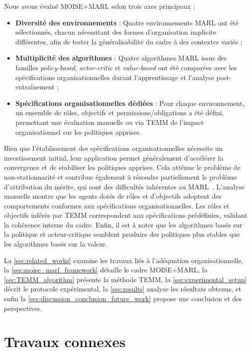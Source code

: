 \documentclass[francais,ROIA,Unicode,manuscript]{cedram}
\begin{document}
\noindent
Nous avons évalué MOISE+MARL selon trois axes principaux :
%
\begin{itemize}
    \item \textbf{Diversité des environnements} : Quatre environnements MARL ont été sélectionnés, chacun nécessitant des formes d’organisation implicite différentes, afin de tester la généralisabilité du cadre à des contextes variés ;
    \item \textbf{Multiplicité des algorithmes} : Quatre algorithmes MARL issus des familles \textit{policy-based}, \textit{actor-critic} et \textit{value-based} ont été comparées avec les spécifications organisationnelles durant l’apprentissage et l’analyse post-entraînement ;
    \item \textbf{Spécifications organisationnelles dédiées} : Pour chaque environnement, un ensemble de rôles, objectifs et permissions/obligations a été défini, permettant une évaluation manuelle ou via TEMM de l’impact organisationnel sur les politiques apprises.
\end{itemize}
%
Bien que l’établissement des spécifications organisationnelles nécessite un investissement initial, leur application permet généralement d’accélérer la convergence et de stabiliser les politiques apprises. Cela atténue le problème de non-stationnarité et contribue également à résoudre partiellement le problème d’attribution du mérite, qui sont des difficultés inhérentes au MARL~\cite{Albrecht2024book}.
L’analyse manuelle montre que les agents dotés de rôles et d'objectifs adoptent des comportements conformes aux spécifications organisationnelles. Les rôles et objectifs inférés par TEMM correspondent aux spécifications prédéfinies, validant la cohérence interne du cadre.  Enfin, il est à noter que les algorithmes basés sur la politique et acteur-critique semblent produire des politiques plus stables que les algorithmes basés sur la valeur.

\noindent La \autoref{sec:related_works} examine les travaux liés à l'adéquation organisationnelle, la \autoref{sec:moise_marl_framework} détaille le cadre MOISE+MARL, la \autoref{sec:TEMM_algorithm} présente la méthode TEMM, la \autoref{sec:experimental_setup} décrit le protocole expérimental, la \autoref{sec:results} analyse les résultats obtenus, et enfin la \autoref{sec:discussion_conclusion_future_work} propose une conclusion et des perspectives.

\section{Travaux connexes}
\label{sec:related_works}
\end{document}
